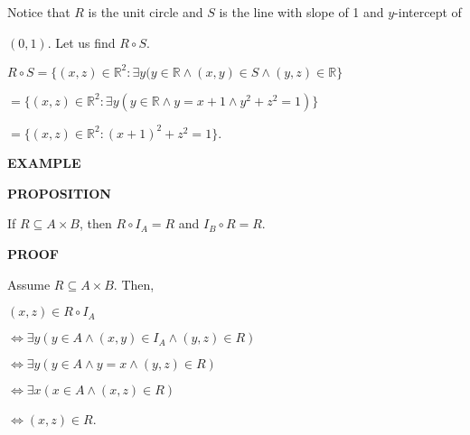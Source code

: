 \documentclass[12pt, a4paper]{article}
\begin{document}
\vspace{4mm}

Notice that $R$ is the unit circle and $S$ is the line with slope of 1 and $y$-intercept of\par$(0,1)$. Let us find $R\circ S$.\par

\vspace{4mm}

\centerline{$R\circ S=\{(x,z)\in\mathbb{R}^2\colon\exists y(y\in\mathbb{R}\wedge(x,y)\in S\wedge(y,z)\in\mathbb{R}\}$}

\vspace{2mm}

\hspace{31.5mm} $=\{(x,z)\in\mathbb{R}^2\colon\exists y(y\in\mathbb{R}\wedge y=x+1\wedge y^2+z^2=1)\}$

\vspace{2mm}

\hspace{31.5mm} $=\{(x,z)\in\mathbb{R}^2\colon(x+1)^2+z^2=1\}$.

\begin{flushleft}

\blacksquare \textbf{ EXAMPLE}

\end{flushleft}

\textbf{\textsc{PROPOSITION }}\par 
\hspace{5mm}If $R\subseteq A\times B$, then $R\circ I_A=R$ and $I_B\circ R=R$.

\vspace{4mm}

\textbf{\textsc{PROOF}}\par

\hspace{5mm}Assume $R\subseteq A\times B$. Then,\par

\vspace{4mm}

\hspace{10mm}$(x,z)\in R\circ I_A$\par
\vspace{2mm}
\hspace{20mm}$\Leftrightarrow\exists y(y\in A\wedge(x,y)\in I_A\wedge(y,z)\in R)$\par
\vspace{2mm}
\hspace{20mm}$\Leftrightarrow\exists y(y\in A\wedge y=x\wedge(y,z)\in R)$\par
\vspace{2mm}
\hspace{20mm}$\Leftrightarrow\exists x(x\in A\wedge(x,z)\in R)$\par
\vspace{2mm}
\hspace{20mm}$\Leftrightarrow(x,z)\in R$. \blacksquare
\end{document}
